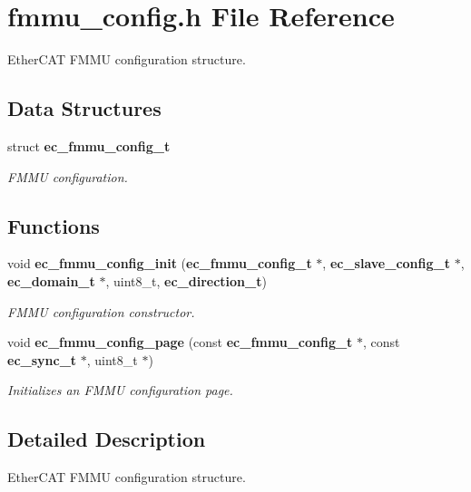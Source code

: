 \section{fmmu\-\_\-config.\-h \-File \-Reference}
\label{fmmu__config_8h}


\-Ether\-C\-A\-T \-F\-M\-M\-U configuration structure.  


\subsection*{\-Data \-Structures}
\begin{DoxyCompactItemize}
\item 
struct {\bf ec\-\_\-fmmu\-\_\-config\-\_\-t}
\begin{DoxyCompactList}\small\item\em \-F\-M\-M\-U configuration. \end{DoxyCompactList}\end{DoxyCompactItemize}
\subsection*{\-Functions}
\begin{DoxyCompactItemize}
\item 
void {\bf ec\-\_\-fmmu\-\_\-config\-\_\-init} ({\bf ec\-\_\-fmmu\-\_\-config\-\_\-t} $\ast$, {\bf ec\-\_\-slave\-\_\-config\-\_\-t} $\ast$, {\bf ec\-\_\-domain\-\_\-t} $\ast$, uint8\-\_\-t, {\bf ec\-\_\-direction\-\_\-t})
\begin{DoxyCompactList}\small\item\em \-F\-M\-M\-U configuration constructor. \end{DoxyCompactList}\item 
void {\bf ec\-\_\-fmmu\-\_\-config\-\_\-page} (const {\bf ec\-\_\-fmmu\-\_\-config\-\_\-t} $\ast$, const {\bf ec\-\_\-sync\-\_\-t} $\ast$, uint8\-\_\-t $\ast$)
\begin{DoxyCompactList}\small\item\em \-Initializes an \-F\-M\-M\-U configuration page. \end{DoxyCompactList}\end{DoxyCompactItemize}


\subsection{\-Detailed \-Description}
\-Ether\-C\-A\-T \-F\-M\-M\-U configuration structure. 

